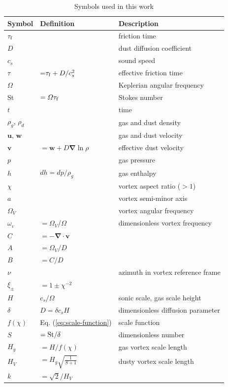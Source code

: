 \documentclass[apj]{emulateapj}
\renewcommand{\v}[1]{{\boldsymbol{#1}}} %
\newcommand{\del}{\v{\nabla}}
\newcommand{\grad}{\del}
\newcommand{\Div}{\del\cdot}
\newcommand{\Eq}[1]{Eq. (\ref{#1})}
\newcommand{\eq}[1]{\Eq{#1}}
\newcommand{\tauf}{\tau_{\rm f}}
\newcommand{\St}{{\rm St}}
\begin{document}
\begin{table}
\caption[]{Symbols used in this work}
\label{table:symbols}
\begin{center}
\begin{tabular}{l l l}\hline
Symbol & Definition & Description \\\hline
$\tauf$ && friction time\\
$D$ & & dust diffusion coefficient \\
$c_s$ & & sound speed \\
$\tau$ & =$\tauf + D/c_s^2$& effective friction time\\
$\varOmega$ & & Keplerian angular frequency \\
\St & $= \varOmega \tauf$ & Stokes number \\
$t$ &  & time \\
$\rho_g$, $\rho_d$  & & gas and dust density\\
$\v{u}$, $\v{w}$ & & gas and dust velocity\\
$\v{v}$ & $= \v{w} + D\grad\ln\rho$ & effective dust velocity \\
$p$ && gas pressure \\
$h$ &$dh=dp/\rho_g$ & gas enthalpy\\
$\chi$ & & vortex aspect ratio ($>1$) \\
$a$ & & vortex semi-minor axis \\
$\varOmega_V$ & & vortex angular frequency \\
$\omega_{_V}$ &  $=\varOmega_V$/$\varOmega$ & dimensionless vortex frequency  \\
$C$ & $=-\Div{\v{v}}$ &  \\
$A$ & $=\varOmega_V/D$ & \\
$B$  &$=C/D$ & \\
$\nu$ & & azimuth in vortex reference frame\\
$\xi_\pm$ & $ = 1\pm\chi^{-2}$ \\
$H$ & $c_s/\varOmega$ & sonic scale, gas scale height\\
$\delta$ & $D=\delta c_s H$ & dimensionless diffusion parameter\\
$f(\chi)$ & \eq{eq:scale-function} & scale function \\
$S$ & $= \St/\delta$ & dimensionless number \\
$H_g$ & $=H/f(\chi)$ & gas vortex scale length \\
$H_V$ & $=H_g \sqrt{\frac{1}{S+1}}$ & dusty vortex scale length \\
$k$ & $=\sqrt{2}/H_V$ & \\ 

\end{tabular}
\end{center}
\end{table}
\end{document}
